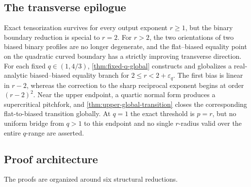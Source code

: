 \documentclass[11pt,reqno]{amsart}
\numberwithin{equation}{section}
\theoremstyle{definition}
\theoremstyle{remark}
\begin{document}
\subsection{The transverse epilogue}
Exact tensorization survives for every output exponent $r\ge1$, but the binary boundary reduction is special to $r=2$.  For $r>2$, the two orientations of two biased binary profiles are no longer degenerate, and the flat--biased equality point on the quadratic curved boundary has a strictly improving transverse direction.  For each fixed $q\in(1,4/3)$, \cref{thm:fixed-q-global} constructs and globalizes a real-analytic biased--biased equality branch for $2\le r<2+\varepsilon_q$.  The first bias is linear in $r-2$, whereas the correction to the sharp reciprocal exponent begins at order $(r-2)^2$.  Near the upper endpoint, a quartic normal form produces a supercritical pitchfork, and \cref{thm:upper-global-transition} closes the corresponding flat-to-biased transition globally.  At $q=1$ the exact threshold is $p=r$, but no uniform bridge from $q>1$ to this endpoint and no single $r$-radius valid over the entire $q$-range are asserted.

\subsection{Proof architecture}
The proofs are organized around six structural reductions.
\end{document}
